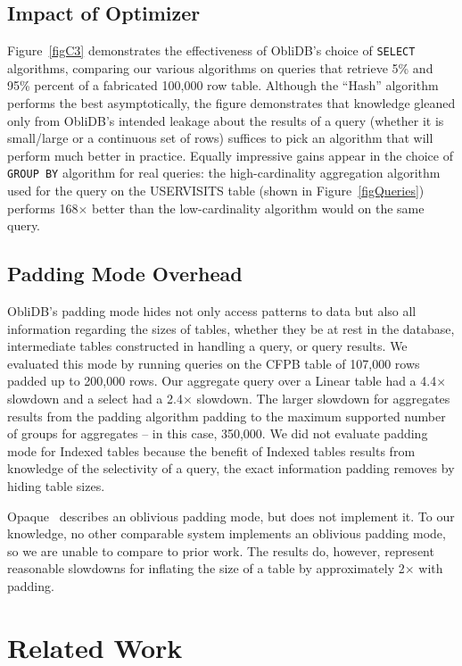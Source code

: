 \documentclass[letterpaper,twocolumn,10pt]{article}
\def\name/{ObliDB}
\begin{document}
\subsection{Impact of Optimizer}
Figure~\ref{figC3} demonstrates the effectiveness of \name/'s choice of \texttt{SELECT} algorithms, comparing our various algorithms on queries that retrieve 5\% and 95\% percent of a fabricated 100,000 row table. Although the ``Hash'' algorithm performs the best asymptotically, the figure demonstrates that knowledge gleaned only from \name/'s intended leakage about the results of a query (whether it is small/large or a continuous set of rows) suffices to pick an algorithm that will perform much better in practice. Equally impressive gains appear in the choice of \texttt{GROUP BY} algorithm for real queries: the high-cardinality aggregation algorithm used for the query on the USERVISITS table (shown in Figure~\ref{figQueries}) performs 168$\times$ better than the low-cardinality algorithm would on the same query.

\subsection{Padding Mode Overhead}
\name/'s padding mode hides not only access patterns to data but also all information regarding the sizes of tables, whether they be at rest in the database, intermediate tables constructed in handling a query, or query results. We evaluated this mode by running queries on the CFPB table of 107,000 rows padded up to 200,000 rows. Our aggregate query over a Linear table had a 4.4$\times$ slowdown and a select had a 2.4$\times$ slowdown. The larger slowdown for aggregates results from the padding algorithm padding to the maximum supported number of groups for aggregates -- in this case, 350,000. We did not evaluate padding mode for Indexed tables because the benefit of Indexed tables results from knowledge of the selectivity of a query, the exact information padding removes by hiding table sizes.

Opaque~\cite{ZDB+17} describes an oblivious padding mode, but does not implement it. To our knowledge, no other comparable system implements an oblivious padding mode, so we are unable to compare to prior work. The results do, however, represent reasonable slowdowns for inflating the size of a table by approximately 2$\times$ with padding.

\section{Related Work}\label{related}
\end{document}
